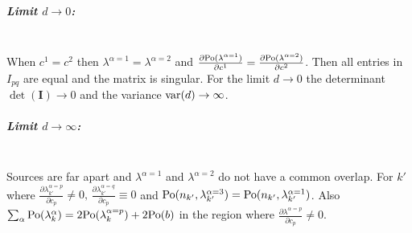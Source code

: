 \subparagraph*{Limit $d\rightarrow0$:}\ \\
%
When $c^1=c^2$ then $\lambda^{\alpha=1}=\lambda^{\alpha=2}$ and $\frac{\partial\mathrm{Po}(\lambda^{\alpha=1})}{\partial c^1}=\frac{\partial\mathrm{Po}(\lambda^{\alpha=2})}{\partial c^2}$.
Then all entries in $I_{pq}$ are equal and the matrix is singular. For the limit $d\rightarrow0$ the determinant $\det(\bm{I})\rightarrow0$ and the variance $\mathrm{var}(d)\rightarrow\infty$.

\subparagraph*{Limit $d\rightarrow\infty$:}\ \\
%
Sources are far apart and $\lambda^{\alpha=1}$ and $\lambda^{\alpha=2}$ do not have a common overlap. For $k'$ where $\frac{\partial\lambda_{k'}^{\alpha=p}}{\partial c_p}\neq0,\,\frac{\partial\lambda_{k'}^{\alpha=q}}{\partial c_p}\equiv0$ and $\mathrm{Po}(n_{k'},\lambda_{k'}^{\alpha=3})=\mathrm{Po}(n_{k'},\lambda_{k'}^{\alpha=1})$. Also $\sum_\alpha\mathrm{Po}(\lambda_k^\alpha)=2\mathrm{Po}(\lambda_k^{\alpha=p})+2\mathrm{Po}(b)$ in the region where $\frac{\partial\lambda^{\alpha=p}}{\partial c_p}\neq 0$.

